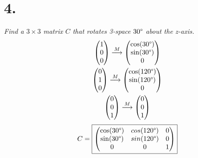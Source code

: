 \documentclass[12pt]{article}
\begin{document}
\section*{4.}
\textit{Find a $3 \times 3$ matrix $C$ that rotates 3-space $30 \degree$ about
the z-axis.}
\begin{gather*}
	\begin{pmatrix} 1 \\ 0 \\ 0 \end{pmatrix}
	\overset{M}{\longrightarrow}
	\begin{pmatrix} \cos(30 \degree) \\ \sin(30 \degree) \\ 0 \end{pmatrix}
	\\
	\begin{pmatrix} 0 \\ 1 \\ 0 \end{pmatrix}
	\overset{M}{\longrightarrow}
	\begin{pmatrix} \cos(120 \degree) \\ \sin(120 \degree) \\ 0 \end{pmatrix}
	\\
	\begin{pmatrix} 0 \\ 0 \\ 1 \end{pmatrix}
	\overset{M}{\longrightarrow}
	\begin{pmatrix} 0 \\ 0 \\ 1 \end{pmatrix}
\end{gather*}
\begin{equation*}
	C =
	\boxed{
		\begin{pmatrix}
			\cos(30 \degree) & cos(120 \degree) & 0 \\
			\sin(30 \degree) & sin(120 \degree) & 0 \\
			0 & 0 & 1
		\end{pmatrix}
	}
\end{equation*}
\end{document}
